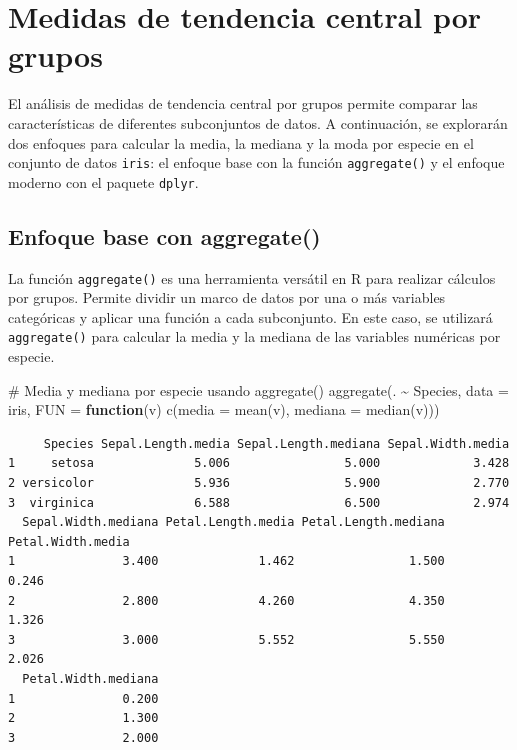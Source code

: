 \documentclass[
  spanish,
  a4paper,
  DIV=11,
  numbers=noendperiod,
  onepage,
  openany]{scrreprt}
\newenvironment{Shaded}{\begin{snugshade}}{\end{snugshade}}
\newcommand{\AttributeTok}[1]{\textcolor[rgb]{0.40,0.45,0.13}{#1}}
\newcommand{\CommentTok}[1]{\textcolor[rgb]{0.37,0.37,0.37}{#1}}
\newcommand{\ControlFlowTok}[1]{\textcolor[rgb]{0.00,0.23,0.31}{\textbf{#1}}}
\newcommand{\FunctionTok}[1]{\textcolor[rgb]{0.28,0.35,0.67}{#1}}
\newcommand{\NormalTok}[1]{\textcolor[rgb]{0.00,0.23,0.31}{#1}}
\newcommand{\SpecialCharTok}[1]{\textcolor[rgb]{0.37,0.37,0.37}{#1}}
\begin{document}
\section{Medidas de tendencia central por
grupos}\label{medidas-de-tendencia-central-por-grupos}

El análisis de medidas de tendencia central por grupos permite comparar
las características de diferentes subconjuntos de datos. A continuación,
se explorarán dos enfoques para calcular la media, la mediana y la moda
por especie en el conjunto de datos \texttt{iris}: el enfoque base con
la función \texttt{aggregate()} y el enfoque moderno con el paquete
\texttt{dplyr}.

\subsection{Enfoque base con
aggregate()}\label{enfoque-base-con-aggregate}

La función \texttt{aggregate()} es una herramienta versátil en R para
realizar cálculos por grupos. Permite dividir un marco de datos por una
o más variables categóricas y aplicar una función a cada subconjunto. En
este caso, se utilizará \texttt{aggregate()} para calcular la media y la
mediana de las variables numéricas por especie.

\begin{Shaded}
\begin{Highlighting}[]
\CommentTok{\# Media y mediana por especie usando aggregate()}
\FunctionTok{aggregate}\NormalTok{(. }\SpecialCharTok{\textasciitilde{}}\NormalTok{ Species,}
          \AttributeTok{data =}\NormalTok{ iris,}
          \AttributeTok{FUN  =} \ControlFlowTok{function}\NormalTok{(v) }\FunctionTok{c}\NormalTok{(}\AttributeTok{media =} \FunctionTok{mean}\NormalTok{(v),}
                               \AttributeTok{mediana =} \FunctionTok{median}\NormalTok{(v)))}
\end{Highlighting}
\end{Shaded}

\begin{verbatim}
     Species Sepal.Length.media Sepal.Length.mediana Sepal.Width.media
1     setosa              5.006                5.000             3.428
2 versicolor              5.936                5.900             2.770
3  virginica              6.588                6.500             2.974
  Sepal.Width.mediana Petal.Length.media Petal.Length.mediana Petal.Width.media
1               3.400              1.462                1.500             0.246
2               2.800              4.260                4.350             1.326
3               3.000              5.552                5.550             2.026
  Petal.Width.mediana
1               0.200
2               1.300
3               2.000
\end{verbatim}
\end{document}
